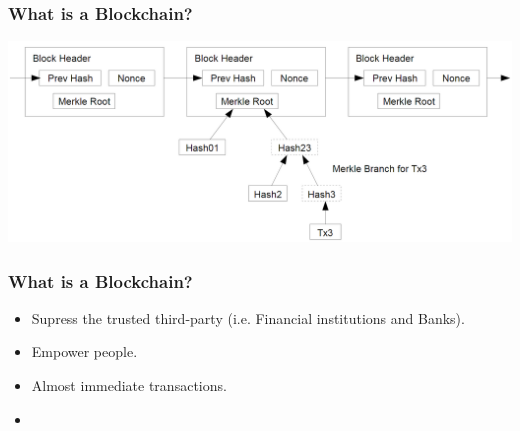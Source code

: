 \documentclass[notitlepage, usenames,dvipsnames]{beamer}
\begin{document}
\begin{frame}
    \frametitle{What is a Blockchain?}

    \begin{overlayarea}{\textwidth}{\textheight}

    \vspace{4ex}

     {
    }

     {
        \vspace{4ex}
        \includegraphics[scale=0.26]{../img/block-chain.png}
    }

    \end{overlayarea}
\end{frame}


\begin{frame}
    \frametitle{What is a Blockchain?}

    \begin{overlayarea}{\textwidth}{\textheight}

    \vspace{4ex}

     {
    }

     {
        \vspace{4ex}
        \begin{itemize}
            \item \alert{Supress} the trusted third-party (i.e. Financial institutions and Banks).
            \item \alert{Empower} people.
            \item Almost \alert{immediate} transactions.
            \item  %
        \end{itemize}

    }

    \end{overlayarea}
\end{frame}
\end{document}
